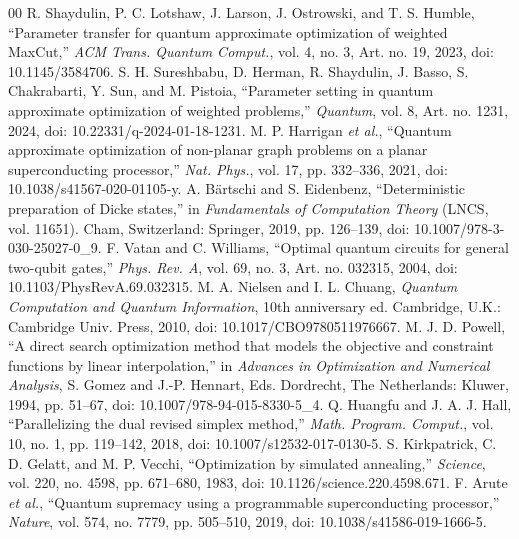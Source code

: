 \documentclass[conference]{IEEEtran}
\begin{document}
\begin{thebibliography}{00}
 R. Shaydulin, P. C. Lotshaw, J. Larson, J. Ostrowski, and T. S. Humble, ``Parameter transfer for quantum approximate optimization of weighted MaxCut,'' \textit{ACM Trans. Quantum Comput.}, vol. 4, no. 3, Art. no. 19, 2023, doi: 10.1145/3584706.
 S. H. Sureshbabu, D. Herman, R. Shaydulin, J. Basso, S. Chakrabarti, Y. Sun, and M. Pistoia, ``Parameter setting in quantum approximate optimization of weighted problems,'' \textit{Quantum}, vol. 8, Art. no. 1231, 2024, doi: 10.22331/q-2024-01-18-1231.
 M. P. Harrigan \textit{et al.}, ``Quantum approximate optimization of non-planar graph problems on a planar superconducting processor,'' \textit{Nat. Phys.}, vol. 17, pp. 332--336, 2021, doi: 10.1038/s41567-020-01105-y.
 A. B\"{a}rtschi and S. Eidenbenz, ``Deterministic preparation of Dicke states,'' in \textit{Fundamentals of Computation Theory} (LNCS, vol. 11651). Cham, Switzerland: Springer, 2019, pp. 126--139, doi: 10.1007/978-3-030-25027-0\_9.
 F. Vatan and C. Williams, ``Optimal quantum circuits for general two-qubit gates,'' \textit{Phys. Rev. A}, vol. 69, no. 3, Art. no. 032315, 2004, doi: 10.1103/PhysRevA.69.032315.
 M. A. Nielsen and I. L. Chuang, \textit{Quantum Computation and Quantum Information}, 10th anniversary ed. Cambridge, U.K.: Cambridge Univ. Press, 2010, doi: 10.1017/CBO9780511976667.
 M. J. D. Powell, ``A direct search optimization method that models the objective and constraint functions by linear interpolation,'' in \textit{Advances in Optimization and Numerical Analysis}, S. Gomez and J.-P. Hennart, Eds. Dordrecht, The Netherlands: Kluwer, 1994, pp. 51--67, doi: 10.1007/978-94-015-8330-5\_4.
 Q. Huangfu and J. A. J. Hall, ``Parallelizing the dual revised simplex method,'' \textit{Math. Program. Comput.}, vol. 10, no. 1, pp. 119--142, 2018, doi: 10.1007/s12532-017-0130-5.
 S. Kirkpatrick, C. D. Gelatt, and M. P. Vecchi, ``Optimization by simulated annealing,'' \textit{Science}, vol. 220, no. 4598, pp. 671--680, 1983, doi: 10.1126/science.220.4598.671.
 F. Arute \textit{et al.}, ``Quantum supremacy using a programmable superconducting processor,'' \textit{Nature}, vol. 574, no. 7779, pp. 505--510, 2019, doi: 10.1038/s41586-019-1666-5.
\end{thebibliography}
\end{document}
